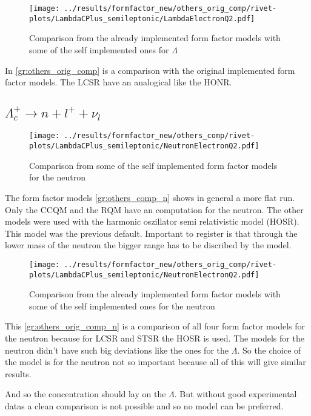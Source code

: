 \begin{figure}[h]
  \centering
  \texttt{[image: ../results/formfactor\_new/others\_orig\_comp/rivet-plots/LambdaCPlus\_semileptonic/LambdaElectronQ2.pdf]}
  \caption{Comparison from the already implemented form factor models with 
  some of the self implemented ones for \(\Lambda\)} \label{gr:others_orig_comp}
\end{figure}
In {\eqref{gr:others_orig_comp}} is a comparison with the original implemented 
form factor models. The LCSR have an analogical like the HONR.


\clearpage
\subsection{\(\Lambda_c^+ \rightarrow n + l^+ + \nu_l\)}
\begin{figure}[h]
  \centering
  \texttt{[image: ../results/formfactor\_new/others\_comp/rivet-plots/LambdaCPlus\_semileptonic/NeutronElectronQ2.pdf]}
  \caption{Comparison from some of the self implemented form factor models for the neutron} \label{gr:others_comp_n}
\end{figure}
The form factor models {\eqref{gr:others_comp_n}} shows in general a more 
flat run. Only the CCQM and the RQM have an computation for the neutron.
The other models were used with the harmonic oszillator semi relativistic 
model (HOSR). This model was the previous default. Important to register is that 
through the lower mass of the neutron the bigger range has to be discribed 
by the model.

\begin{figure}[h]
  \centering
  \texttt{[image: ../results/formfactor\_new/others\_orig\_comp/rivet-plots/LambdaCPlus\_semileptonic/NeutronElectronQ2.pdf]}
  \caption{Comparison from the already implemented form factor models with 
  some of the self implemented ones for the neutron} \label{gr:others_orig_comp_n}
\end{figure}
This {\eqref{gr:others_orig_comp_n}} is a comparison of all four form factor 
models for the neutron because for LCSR and STSR the HOSR is used. The models for 
the neutron didn't have such big deviations like the ones for the \(\Lambda\). 
So the choice of the model is for the neutron not so important because all of this 
will give similar results.
\par
And so the concentration should lay on the \(\Lambda\). But without good 
experimental datas a clean comparison is not possible and so no model can 
be preferred.

